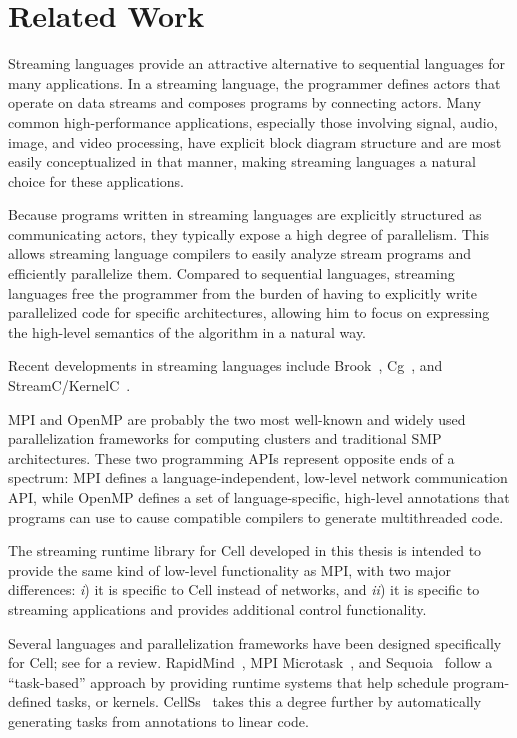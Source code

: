 \section{Related Work}\label{ch:bg}

Streaming languages provide an attractive alternative to sequential languages for many applications. In a streaming language, the programmer defines actors that operate on data streams and composes programs by connecting actors. Many common high-performance applications, especially those involving signal, audio, image, and video processing, have explicit block diagram structure and are most easily conceptualized in that manner, making streaming languages a natural choice for these applications.

Because programs written in streaming languages are explicitly structured as communicating actors, they typically expose a high degree of parallelism. This allows streaming language compilers to easily analyze stream programs and efficiently parallelize them. Compared to sequential languages, streaming languages free the programmer from the burden of having to explicitly write parallelized code for specific architectures, allowing him to focus on expressing the high-level semantics of the algorithm in a natural way.

Recent developments in streaming languages include Brook~\cite{brook}, Cg~\cite{cg}, and StreamC/KernelC~\cite{streamc}.

MPI and OpenMP are probably the two most well-known and widely used parallelization frameworks for computing clusters and traditional SMP architectures. These two programming APIs represent opposite ends of a spectrum: MPI defines a language-independent, low-level network communication API, while OpenMP defines a set of language-specific, high-level annotations that programs can use to cause compatible compilers to generate multithreaded code.

The streaming runtime library for Cell developed in this thesis is intended to provide the same kind of low-level functionality as MPI, with two major differences: \emph{i}) it is specific to Cell instead of networks, and \emph{ii}) it is specific to streaming applications and provides additional control functionality.

Several languages and parallelization frameworks have been designed specifically for Cell; see \cite{cell:pf} for a review. RapidMind~\cite{rapidmind}, MPI Microtask~\cite{mpimicrotask}, and Sequoia~\cite{sequoia} follow a ``task-based'' approach by providing runtime systems that help schedule program-defined tasks, or kernels. CellSs~\cite{cellss} takes this a degree further by automatically generating tasks from annotations to linear code.


